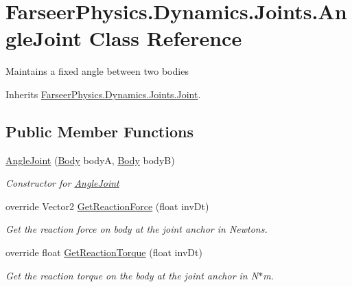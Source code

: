\hypertarget{class_farseer_physics_1_1_dynamics_1_1_joints_1_1_angle_joint}{\section{Farseer\+Physics.\+Dynamics.\+Joints.\+Angle\+Joint Class Reference}
\label{class_farseer_physics_1_1_dynamics_1_1_joints_1_1_angle_joint}
}


Maintains a fixed angle between two bodies  




Inherits \hyperlink{class_farseer_physics_1_1_dynamics_1_1_joints_1_1_joint}{Farseer\+Physics.\+Dynamics.\+Joints.\+Joint}.

\subsection*{Public Member Functions}
\begin{DoxyCompactItemize}
\item 
\hyperlink{class_farseer_physics_1_1_dynamics_1_1_joints_1_1_angle_joint_a085b14ac4a20ced1968c740c2f4c8674}{Angle\+Joint} (\hyperlink{class_farseer_physics_1_1_dynamics_1_1_body}{Body} body\+A, \hyperlink{class_farseer_physics_1_1_dynamics_1_1_body}{Body} body\+B)
\begin{DoxyCompactList}\small\item\em Constructor for \hyperlink{class_farseer_physics_1_1_dynamics_1_1_joints_1_1_angle_joint}{Angle\+Joint} \end{DoxyCompactList}\item 
override Vector2 \hyperlink{class_farseer_physics_1_1_dynamics_1_1_joints_1_1_angle_joint_a19ce23a3970f7cee3a7c869b8941c5bb}{Get\+Reaction\+Force} (float inv\+Dt)
\begin{DoxyCompactList}\small\item\em Get the reaction force on body at the joint anchor in Newtons. \end{DoxyCompactList}\item 
override float \hyperlink{class_farseer_physics_1_1_dynamics_1_1_joints_1_1_angle_joint_af63e76838c76b9d88305e7320307e1ed}{Get\+Reaction\+Torque} (float inv\+Dt)
\begin{DoxyCompactList}\small\item\em Get the reaction torque on the body at the joint anchor in N$\ast$m. \end{DoxyCompactList}\end{DoxyCompactItemize}
